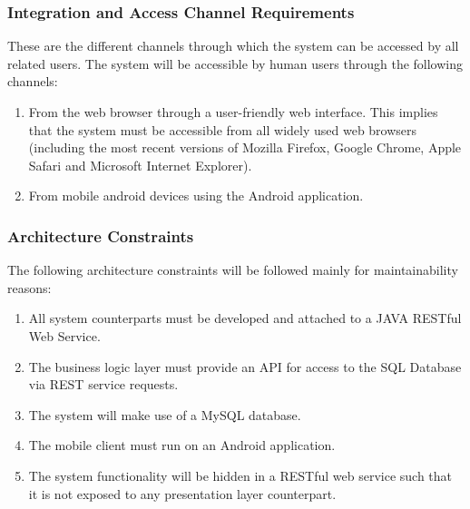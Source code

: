 \documentclass[12pt]{article}
\begin{document}
                			\subsubsection{Integration and Access Channel Requirements}
                					These are the different channels through which the system can be accessed by all related users.
	                				The system will be accessible by human users through the following channels:
	                				
			                    	\begin{enumerate}
					                    	\item From the web browser through a user-friendly web interface. This implies that the system must be accessible from all widely used web browsers (including the most recent versions of Mozilla Firefox, Google Chrome, Apple Safari and Microsoft Internet Explorer).
					                    	\item From mobile android devices using the Android application.
			                    	\end{enumerate}  
			                    	  
                			\subsubsection{Architecture Constraints}
                					The following architecture constraints will be followed mainly for maintainability reasons:
                					\begin{enumerate}
                							\item All system counterparts must be developed and attached to a JAVA RESTful Web Service.
                							\item The business logic layer must provide an API for access to the SQL Database via REST service requests.
                							\item The system will make use of a MySQL database.
                							\item The mobile client must run on an Android application.
                							\item The system functionality will be hidden in a RESTful web service such that it is not exposed to any presentation layer counterpart.
                					\end{enumerate}
                				
                			  
\end{document}
